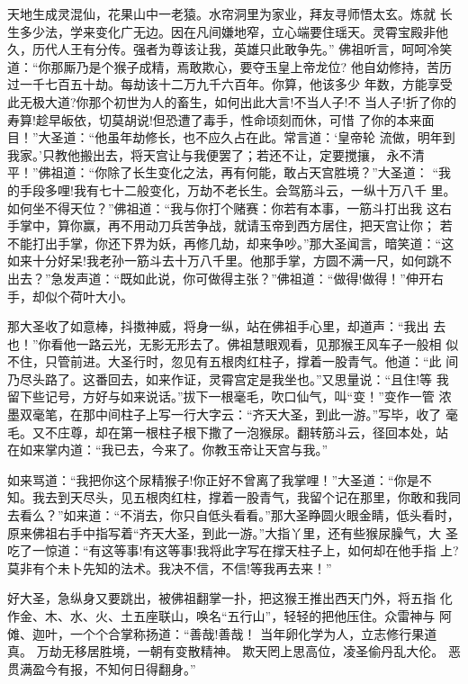 天地生成灵混仙，花果山中一老猿。水帘洞里为家业，拜友寻师悟太玄。炼就
长生多少法，学来变化广无边。因在凡间嫌地窄，立心端要住瑶天。灵霄宝殿非他
久，历代人王有分传。强者为尊该让我，英雄只此敢争先。”
佛祖听言，呵呵冷笑道：“你那厮乃是个猴子成精，焉敢欺心，要夺玉皇上帝龙位?
他自幼修持，苦历过一千七百五十劫。每劫该十二万九千六百年。你算，他该多少
年数，方能享受此无极大道?你那个初世为人的畜生，如何出此大言!不当人子!不
当人子!折了你的寿算!趁早皈依，切莫胡说!但恐遭了毒手，性命顷刻而休，可惜
了你的本来面目！”大圣道：“他虽年劫修长，也不应久占在此。常言道：‘皇帝轮
流做，明年到我家。’只教他搬出去，将天宫让与我便罢了；若还不让，定要搅攘，
永不清平！”佛祖道：“你除了长生变化之法，再有何能，敢占天宫胜境？”大圣道：
“我的手段多哩!我有七十二般变化，万劫不老长生。会驾筋斗云，一纵十万八千
里。如何坐不得天位？”佛祖道：“我与你打个赌赛：你若有本事，一筋斗打出我
这右手掌中，算你赢，再不用动刀兵苦争战，就请玉帝到西方居住，把天宫让你；
若不能打出手掌，你还下界为妖，再修几劫，却来争吵。”那大圣闻言，暗笑道：“这
如来十分好呆!我老孙一筋斗去十万八千里。他那手掌，方圆不满一尺，如何跳不
出去？”急发声道：“既如此说，你可做得主张？”佛祖道：“做得!做得！”伸开右
手，却似个荷叶大小。

那大圣收了如意棒，抖擞神威，将身一纵，站在佛祖手心里，却道声：“我出
去也！”你看他一路云光，无影无形去了。佛祖慧眼观看，见那猴王风车子一般相
似不住，只管前进。大圣行时，忽见有五根肉红柱子，撑着一股青气。他道：“此
间乃尽头路了。这番回去，如来作证，灵霄宫定是我坐也。”又思量说：“且住!等
我留下些记号，方好与如来说话。”拔下一根毫毛，吹口仙气，叫“变！”变作一管
浓墨双毫笔，在那中间柱子上写一行大字云：“齐天大圣，到此一游。”写毕，收了
毫毛。又不庄尊，却在第一根柱子根下撒了一泡猴尿。翻转筋斗云，径回本处，站
在如来掌内道：“我已去，今来了。你教玉帝让天宫与我。”

如来骂道：“我把你这个尿精猴子!你正好不曾离了我掌哩！”大圣道：“你是不
知。我去到天尽头，见五根肉红柱，撑着一股青气，我留个记在那里，你敢和我同
去看么？”如来道：“不消去，你只自低头看看。”那大圣睁圆火眼金睛，低头看时，
原来佛祖右手中指写着“齐天大圣，到此一游。”大指丫里，还有些猴尿臊气，大
圣吃了一惊道：“有这等事!有这等事!我将此字写在撑天柱子上，如何却在他手指
上?莫非有个未卜先知的法术。我决不信，不信!等我再去来！”

好大圣，急纵身又要跳出，被佛祖翻掌一扑，把这猴王推出西天门外，将五指
化作金、木、水、火、土五座联山，唤名“五行山”，轻轻的把他压住。众雷神与
阿傩、迦叶，一个个合掌称扬道：“善哉!善哉！
当年卵化学为人，立志修行果道真。
万劫无移居胜境，一朝有变散精神。
欺天罔上思高位，凌圣偷丹乱大伦。
恶贯满盈今有报，不知何日得翻身。”

